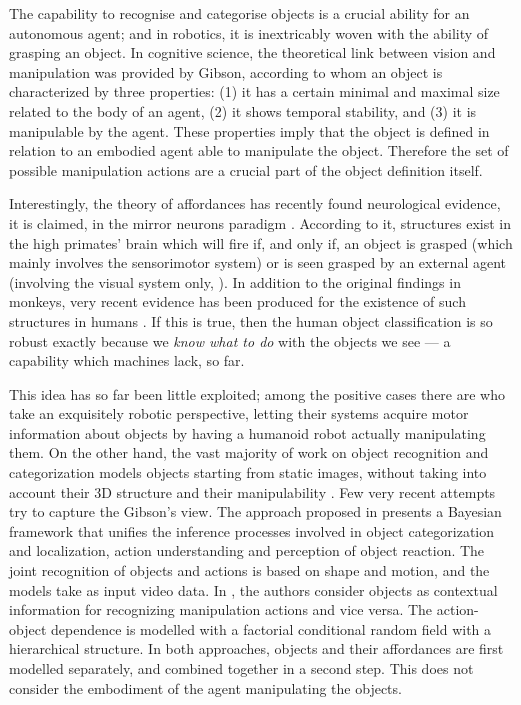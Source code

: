 The capability to recognise and categorise objects is a crucial
ability for an autonomous agent; and in robotics, it is inextricably
woven with the ability of grasping an object. In cognitive science, the
theoretical link between vision and manipulation was provided by 
Gibson, according to whom an object is characterized by three
properties: (1) it has a certain minimal and maximal size related to the
body of an agent, (2) it shows temporal stability, and (3) it is manipulable
by the agent. These properties imply that the object is defined in relation
to an embodied agent able to manipulate the object. Therefore the set of
possible manipulation actions are a crucial part of the object definition
itself. 

Interestingly, the theory of affordances has recently found neurological evidence,
it is claimed, in the mirror neurons paradigm \cite{gallese-96,rizzolatti-04}.
According to it, structures exist in the high primates' brain which will fire
if, and only if, an object is grasped (which mainly involves the sensorimotor
system) or is seen grasped by an external agent (involving the visual system only,
\cite{umilta-01}). In addition to the original findings in monkeys, very recent
evidence has been produced for the existence of such structures in humans
\cite{friston09}. If this is true, then the human object classification is
so robust exactly because we \emph{know what to do} with the
objects we see --- a capability which machines lack, so far.

This idea has so far been little exploited; among the positive cases there
are \cite{metta-06,lopes-05} who take an exquisitely robotic perspective,
letting their systems acquire motor information about objects by
having a humanoid robot actually manipulating them. On the other hand,
the vast majority of work on object recognition and categorization
models objects starting from static images, without taking into account
their 3D structure and their manipulability \cite{griffin_perona_cvpr2008,leibe_etal_ijcv2008}.
Few very recent attempts try to capture the Gibson's view. The approach
proposed in \cite{gupta_davis_cvpr2008} presents a Bayesian framework that
unifies the inference processes involved in object categorization and
localization, action understanding and perception of object reaction.
The joint recognition of objects and actions is based on shape and motion,
and the models take as input video data. In \cite{kjellstrom_etal_eccv2008},
the authors consider objects as contextual information for recognizing
manipulation actions and vice versa. The action-object dependence is
modelled with a factorial conditional random field with a hierarchical
structure. In both approaches, objects and their affordances are first
modelled separately, and combined together in a second step. This does
not consider the embodiment of the agent manipulating the objects.
